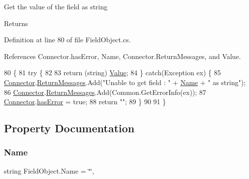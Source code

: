 Get the value of the field as string 

\begin{DoxyReturn}{Returns}

\end{DoxyReturn}


Definition at line 80 of file Field\+Object.\+cs.



References Connector.\+has\+Error, Name, Connector.\+Return\+Messages, and Value.


\begin{DoxyCode}
80                                      \{
81         \textcolor{keywordflow}{try} \{
82 
83             \textcolor{keywordflow}{return} (\textcolor{keywordtype}{string}) \mbox{\hyperlink{class_field_object_a9764fb1824cec95b82cd6ac0b4cd8919}{Value}};
84         \} \textcolor{keywordflow}{catch}(Exception ex) \{
85             \mbox{\hyperlink{class_connector}{Connector}}.\mbox{\hyperlink{class_connector_a1ed422674b344524fd77998dcf6a9ba6}{ReturnMessages}}.Add(\textcolor{stringliteral}{"Unable to get field : "} + 
      \mbox{\hyperlink{class_field_object_ae5d972e96a3eca93407da8e8a89abfd1}{Name}} + \textcolor{stringliteral}{" as string"});
86             \mbox{\hyperlink{class_connector}{Connector}}.\mbox{\hyperlink{class_connector_a1ed422674b344524fd77998dcf6a9ba6}{ReturnMessages}}.Add(Common.GetErrorInfo(ex));
87             \mbox{\hyperlink{class_connector}{Connector}}.\mbox{\hyperlink{class_connector_a079bae21a5417efa53bfe8954c0f533f}{hasError}} = \textcolor{keyword}{true};
88             \textcolor{keywordflow}{return} \textcolor{stringliteral}{""};
89         \}
90         
91     \}
\end{DoxyCode}


\subsection{Property Documentation}
\mbox{\label{class_field_object_ae5d972e96a3eca93407da8e8a89abfd1}} 
\subsubsection{\texorpdfstring{Name}{Name}}
{\footnotesize\ttfamily string Field\+Object.\+Name = \char`\"{}\char`\"{}\hspace{0.3cm}{\ttfamily [get]}, {\ttfamily [set]}}



